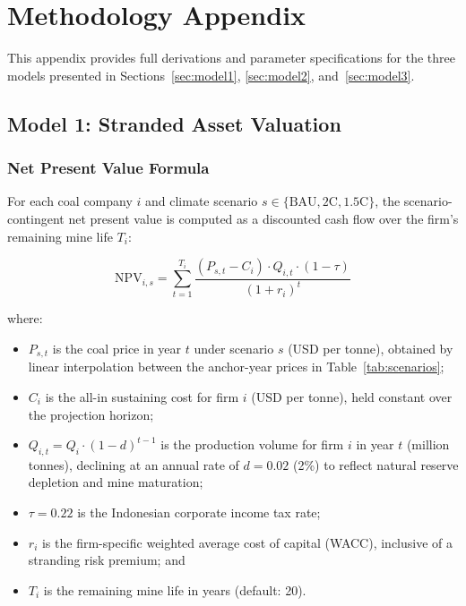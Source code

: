
\section{Methodology Appendix}
\label{sec:appendix_methodology}

This appendix provides full derivations and parameter specifications for the three models presented in Sections~\ref{sec:model1}, \ref{sec:model2}, and~\ref{sec:model3}.


\subsection{Model 1: Stranded Asset Valuation}
\label{subsec:app_model1}

\subsubsection{Net Present Value Formula}

For each coal company $i$ and climate scenario $s \in \{\text{BAU}, 2\text{C}, 1.5\text{C}\}$, the scenario-contingent net present value is computed as a discounted cash flow over the firm's remaining mine life $T_i$:

\begin{equation}
\label{eq:npv_full}
\text{NPV}_{i,s} = \sum_{t=1}^{T_i} \frac{\left(P_{s,t} - C_i\right) \cdot Q_{i,t} \cdot (1 - \tau)}{(1 + r_i)^t}
\end{equation}

\noindent where:
\begin{itemize}
    \item $P_{s,t}$ is the coal price in year $t$ under scenario $s$ (USD per tonne), obtained by linear interpolation between the anchor-year prices in Table~\ref{tab:scenarios};
    \item $C_i$ is the all-in sustaining cost for firm $i$ (USD per tonne), held constant over the projection horizon;
    \item $Q_{i,t} = Q_i \cdot (1 - d)^{t-1}$ is the production volume for firm $i$ in year $t$ (million tonnes), declining at an annual rate of $d = 0.02$ (2\%) to reflect natural reserve depletion and mine maturation;
    \item $\tau = 0.22$ is the Indonesian corporate income tax rate;
    \item $r_i$ is the firm-specific weighted average cost of capital (WACC), inclusive of a stranding risk premium; and
    \item $T_i$ is the remaining mine life in years (default: 20).
\end{itemize}

